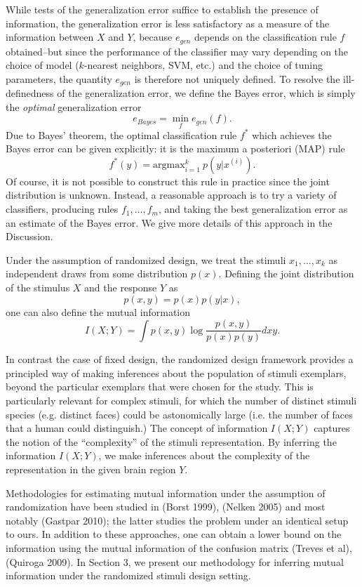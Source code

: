 \documentclass{article}
\newcommand{\argmax}{\text{argmax}}
\begin{document}
While tests of the generalization error suffice to establish the
presence of information, the generalization error is less satisfactory
as a measure of the information between $X$ and $Y$, because
$e_{gen}$ depends on the classification rule $f$ obtained--but since the performance of the classifier
may vary depending on the choice of model ($k$-nearest neighbors, SVM, etc.) and the choice of tuning parameters,
the quantity $e_{gen}$ is therefore not uniquely defined.
To resolve the ill-definedness of the generalization error, we define
the Bayes error, which is simply the \emph{optimal}
generalization error
\[
e_{Bayes} = \min_f e_{gen}(f).
\]
Due to Bayes' theorem, the optimal classification rule $f^*$ which
achieves the Bayes error can be given explicitly: it is the maximum a
posteriori (MAP) rule
\[
f^*(y) = \argmax_{i=1}^k\ p(y|x^{(i)}).
\]
Of course, it is not possible to construct this rule in practice since
the joint distribution is unknown.  Instead, a reasonable approach is
to try a variety of classifiers, producing rules $f_1,\hdots, f_m$,
and taking the best generalization error as an estimate of the Bayes
error.  We give more details of this approach in the Discussion.

Under the assumption of randomized design, we treat the stimuli
$x_1,\hdots, x_k$ as independent draws from some distribution $p(x)$.
Defining the joint distribution of the stimulus $X$ and the response
$Y$ as
\[
p(x, y) = p(x) p(y|x),
\]
one can also define the mutual information
\[
I(X; Y) = \int p(x, y) \log \frac{p(x, y)}{p(x) p(y)} dxy.
\]

In contrast the case of fixed design, the randomized design framework
provides a principled way of making inferences about the population of
stimuli exemplars, beyond the particular exemplars that were chosen
for the study.  This is particularly relevant for complex stimuli, for
which the number of distinct stimuli species (e.g. distinct faces)
could be astonomically large (i.e. the number of faces that a human
could distinguish.)  The concept of information $I(X; Y)$ captures the
notion of the ``complexity'' of the stimuli representation.  By
inferring the information $I(X; Y)$, we make inferences about the
complexity of the representation in the given brain region $Y$.

Methodologies for estimating mutual information under the assumption
of randomization have been studied in (Borst 1999), (Nelken 2005) and
most notably (Gastpar 2010); the latter studies the problem under an
identical setup to ours.  In addition to these approaches, one can
obtain a lower bound on the information using the mutual information
of the confusion matrix (Treves et al), (Quiroga 2009).  In Section 3,
we present our methodology for inferring mutual information under the
randomized stimuli design setting.
\end{document}
